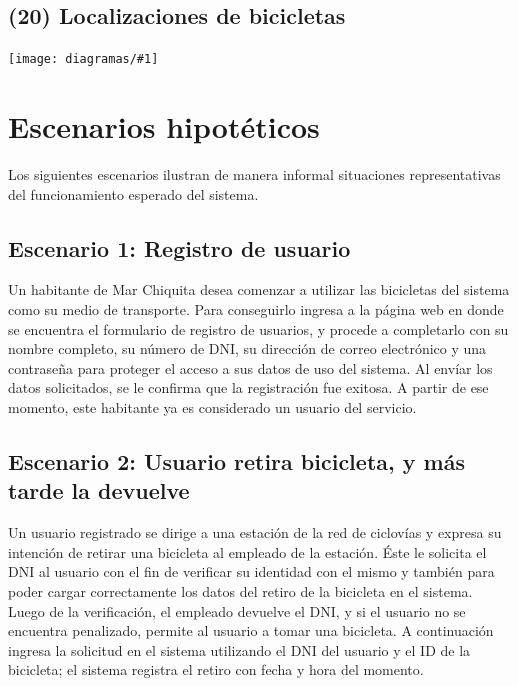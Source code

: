 \documentclass[a4paper, 10pt, twoside]{article}
\newcommand{\diagramah}[1]{
  \texttt{[image: diagramas/\#1]}
}
\begin{document}
\subsection{(20)   Localizaciones de bicicletas}
\diagramah{objetivos-20}




\section{Escenarios hipotéticos}


Los siguientes escenarios ilustran de manera informal situaciones representativas del funcionamiento esperado del sistema.


\subsection{Escenario 1: Registro de usuario}

Un habitante de Mar Chiquita desea comenzar a utilizar las bicicletas del sistema como su medio de transporte. Para conseguirlo ingresa a la página web en donde se encuentra el formulario de registro de usuarios, y procede a completarlo con su nombre completo, su número de DNI, su dirección de correo electrónico y una contraseña para proteger el acceso a sus datos de uso del sistema. Al envíar los datos solicitados, se le confirma que la registración fue exitosa. A partir de ese momento, este habitante ya es considerado un usuario del servicio.


\subsection{Escenario 2: Usuario retira bicicleta, y más tarde la devuelve}

Un usuario registrado se dirige a una estación de la red de ciclovías y expresa su intención de retirar una bicicleta al empleado de la estación. Éste le solicita el DNI al usuario con el fin de verificar su identidad con el mismo y también para poder cargar correctamente los datos del retiro de la bicicleta en el sistema. Luego de la verificación, el empleado devuelve el DNI, y si el usuario no se encuentra penalizado, permite al usuario a tomar una bicicleta. A continuación ingresa la solicitud en el sistema utilizando el DNI del usuario y el ID de la bicicleta; el sistema registra el retiro con fecha y hora del momento.
\end{document}
